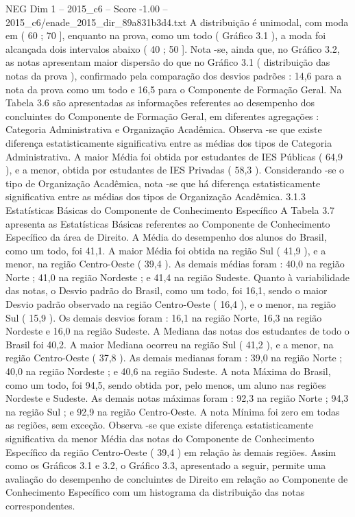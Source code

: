 \begin{textsample}{NEG Dim 1 – 2015\_c6 – Score -1.00 – 2015\_c6/enade\_2015\_dir\_89a831b3d4.txt}
A distribuição é unimodal, com moda em ( 60 ; 70 ], enquanto na prova, como um todo ( Gráfico 3.1 ), a moda foi alcançada dois intervalos abaixo ( 40 ; 50 ].
Nota -se, ainda que, no Gráfico 3.2, as notas apresentam maior dispersão do que no Gráfico 3.1 ( distribuição das notas da prova ), confirmado pela comparação dos desvios padrões : 14,6 para a nota da prova como um todo e 16,5 para o Componente de Formação Geral.
Na Tabela 3.6 são apresentadas as informações referentes ao desempenho dos concluintes do Componente de Formação Geral, em diferentes agregações : Categoria Administrativa e Organização Acadêmica.
Observa -se que existe diferença estatisticamente significativa entre as médias dos tipos de Categoria Administrativa.
A maior Média foi obtida por estudantes de IES Públicas ( 64,9 ), e a menor, obtida por estudantes de IES Privadas ( 58,3 ).
Considerando -se o tipo de Organização Acadêmica, nota -se que há diferença estatisticamente significativa entre as médias dos tipos de Organização Acadêmica. 3.1.3 Estatísticas Básicas do Componente de Conhecimento Específico A Tabela 3.7 apresenta as Estatísticas Básicas referentes ao Componente de Conhecimento Específico da área de Direito.
A Média do desempenho dos alunos do Brasil, como um todo, foi 41,1.
A maior Média foi obtida na região Sul ( 41,9 ), e a menor, na região Centro-Oeste ( 39,4 ).
As demais médias foram : 40,0 na região Norte ; 41,0 na região Nordeste ; e 41,4 na região Sudeste.
Quanto à variabilidade das notas, o Desvio padrão do Brasil, como um todo, foi 16,1, sendo o maior Desvio padrão observado na região Centro-Oeste ( 16,4 ), e o menor, na região Sul ( 15,9 ).
Os demais desvios foram : 16,1 na região Norte, 16,3 na região Nordeste e 16,0 na região Sudeste.
A Mediana das notas dos estudantes de todo o Brasil foi 40,2.
A maior Mediana ocorreu na região Sul ( 41,2 ), e a menor, na região Centro-Oeste ( 37,8 ).
As demais medianas foram : 39,0 na região Norte ; 40,0 na região Nordeste ; e 40,6 na região Sudeste.
A nota Máxima do Brasil, como um todo, foi 94,5, sendo obtida por, pelo menos, um aluno nas regiões Nordeste e Sudeste.
As demais notas máximas foram : 92,3 na região Norte ; 94,3 na região Sul ; e 92,9 na região Centro-Oeste.
A nota Mínima foi zero em todas as regiões, sem exceção.
Observa -se que existe diferença estatisticamente significativa da menor Média das notas do Componente de Conhecimento Específico da região Centro-Oeste ( 39,4 ) em relação às demais regiões.
Assim como os Gráficos 3.1 e 3.2, o Gráfico 3.3, apresentado a seguir, permite uma avaliação do desempenho de concluintes de Direito em relação ao Componente de Conhecimento Específico com um histograma da distribuição das notas correspondentes.

\end{textsample}
